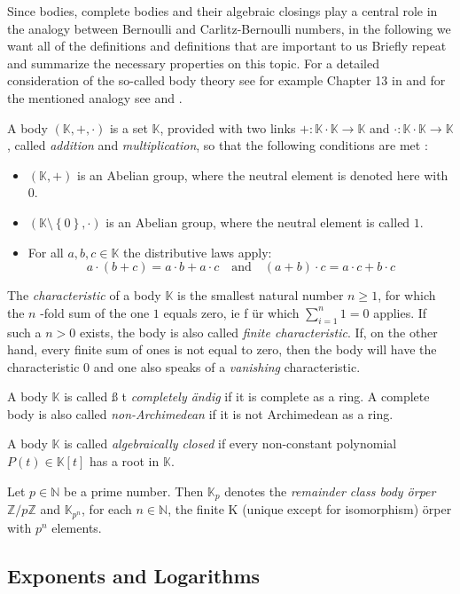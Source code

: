 Since bodies, complete bodies and their algebraic closings play a central role in the analogy between Bernoulli and Carlitz-Bernoulli numbers, in the following we want all of the definitions and definitions that are important to us Briefly repeat and summarize the necessary properties on this topic.
For a detailed consideration of the so-called body theory see for example Chapter 13 in \cite{MA} and for the mentioned analogy see \cite{DG} and \cite{DT}.
\begin{definition} [body]
A body $ (\mathbb{K}, +, \cdot) $ is a set $ \mathbb{K} $, provided with two links $ +: \mathbb{K} \cdot \mathbb{K} \to \mathbb{K} $ and $ \cdot: \mathbb{K} \cdot \mathbb{K} \to \mathbb{K} $, called \textit{addition} and \textit{multiplication}, so that the following conditions are met :
\begin{itemize}
\item $ \left (\mathbb{K}, + \right) $ is an Abelian group, where the neutral element is denoted here with $ 0 $.
\item $ \left (\mathbb{K} \setminus \left \{0 \right \}, \cdot \right) $ is an Abelian group, where the neutral element is called $ 1 $.
\item For all $ a, b, c \in \mathbb{K} $ the distributive laws apply:
$$ a \cdot \left (b + c \right) = a \cdot b + a \cdot c \quad \text{and} \quad
\left (a + b \right) \cdot c = a \cdot c + b \cdot c $$
\end{itemize}
The \textit{characteristic} of a body $ \mathbb{K} $ is the smallest natural number $ n \geq 1 $, for which the $ n $ -fold sum of the one $ 1 $ equals zero, ie f \"ur which $ \sum_{i = 1} ^ n 1 = 0 $ applies.
If such a $ n> 0 $ exists, the body is also called \textit{finite characteristic}. If, on the other hand, every finite sum of ones is not equal to zero, then the body will have the characteristic $ 0 $ and one also speaks of a \textit{vanishing} characteristic.

A body $ \mathbb{K} $ is called \ss{} t \textit{completely \"andig} if
it is complete as a ring. A complete body
is also called \textit{non-Archimedean} if it is not Archimedean as a ring.

A body $ \mathbb{K} $ is called \textit{algebraically closed} if every non-constant polynomial $ P (t) \in \mathbb{K} [t] $
has a root in $ \mathbb{K} $.
\end{definition}
\begin{definition}  Let $ p \in \mathbb{N} $ be a prime number. Then $ \mathbb{K} _p $ denotes the \textit{remainder class body \"orper} $ \mathbb{ Z} / p \mathbb{Z} $ and $ \mathbb{K} _{p ^ n} $, for each $ n \in \mathbb{N} $, the finite K (unique except for isomorphism) \"orper with $ p ^ n $ elements.
\end{definition} 



\subsection{Exponents and Logarithms}

